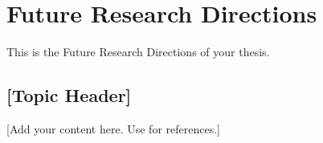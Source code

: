 \chapter{Future Research Directions}
\label{chap:futureresearchdirections}

This is the Future Research Directions of your thesis.

\section{[Topic Header]}
[Add your content here. Use \cite{sample} for references.]
